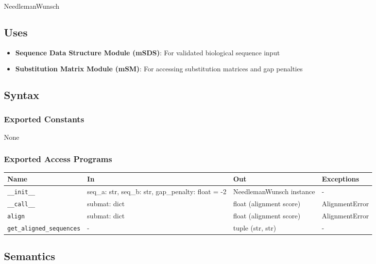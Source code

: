 \documentclass[12pt, titlepage]{article}
\begin{document}
NeedlemanWunsch

\subsection{Uses}

\begin{itemize}
    \item \textbf{Sequence Data Structure Module (mSDS)}: For validated biological sequence input
    \item \textbf{Substitution Matrix Module (mSM)}: For accessing substitution matrices and gap penalties
\end{itemize}

\subsection{Syntax}

\subsubsection{Exported Constants}

None

\subsubsection{Exported Access Programs}

\begin{center}
\begin{tabular}{p{4cm} p{4cm} p{3cm} p{2cm}}
\hline
\textbf{Name} & \textbf{In} & \textbf{Out} & \textbf{Exceptions} \\
\hline
\texttt{\_\_init\_\_} & seq\_a: str, seq\_b: str, gap\_penalty: float = -2 & NeedlemanWunsch instance & - \\
\hline
\texttt{\_\_call\_\_} & submat: dict & float (alignment score) & AlignmentError \\
\hline
\texttt{align} & submat: dict & float (alignment score) & AlignmentError \\
\hline
\texttt{get\_aligned\_sequences} & - & tuple (str, str) & - \\
\hline
\end{tabular}
\end{center}

\subsection{Semantics}
\end{document}
